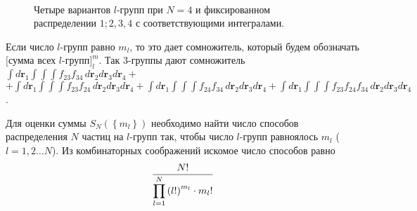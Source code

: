 \begin{figure}[h]
\begin{minipage}{0.33\linewidth}
		\caption*{$\displaystyle \int d \mathbf{r}_1 \int \int \int f_{24} f_{34} \, d \mathbf{r}_2 d \mathbf{r}_3 d \mathbf{r}_4$}
	\end{minipage} \\
	\begin{center}
	\begin{minipage}{0.33\linewidth}
		\caption*{$\displaystyle \int d \mathbf{r}_1 \int \int \int f_{23} f_{24} f_{34} \, d \mathbf{r}_2 d \mathbf{r}_3 d \mathbf{r}_4$}
	\end{minipage}
\end{center}
\caption{Четыре вариантов $l$-групп при $N = 4$ и фиксированном распределении $1; 2, 3, 4$ с соответствующими интегралами.}
\end{figure}

Если число $l$-групп равно $m_l$, то это дает сомножитель, который будем обозначать \\ $\bigg[ \text{сумма всех $l$-групп} \bigg]^m_l$. Так 3-группы дают сомножитель $\displaystyle \int d \mathbf{r}_1 \int \int \int f_{23} f_{34} \, d \mathbf{r}_2 d \mathbf{r}_3 d \mathbf{r}_4 + $ \\ $+ \displaystyle \int d \mathbf{r}_1 \int \int \int f_{23} f_{24} \, d \mathbf{r}_2 d \mathbf{r}_3 d \mathbf{r}_4 + \int d \mathbf{r}_1 \int \int \int f_{24} f_{34} \, d \mathbf{r}_2 d \mathbf{r}_3 d \mathbf{r}_4 + \int d \mathbf{r}_1 \int \int \int f_{23} f_{24} f_{34} \, d \mathbf{r}_2 d \mathbf{r}_3 d \mathbf{r}_4$. \par
Для оценки суммы $S_N \left( \left\{ m_l \right\} \right)$ необходимо найти число способов распределения $N$ частиц на $l$-групп так, чтобы число $l$-групп равноялось $m_l$ ($l = 1, 2 \dots N$). Из комбинаторных соображений искомое число способов равно
\vverh
\begin{gather}
	\dfrac{N!}{\displaystyle\prod_{l=1}^{N} \left( l! \right)^{m_l} \cdot m_l !} \notag 
\end{gather}

